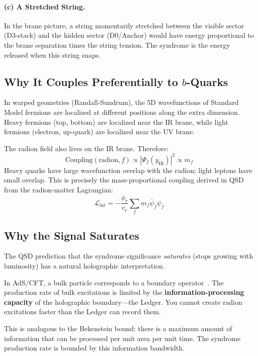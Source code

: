 \documentclass[11pt,a4paper]{article}
\theoremstyle{definition}
\newcommand{\LL}{\mathcal{L}}
\begin{document}
\paragraph{(c) A Stretched String.}
In the brane picture, a string momentarily stretched between the visible
sector (D3-stack) and the hidden sector (D0/Anchor) would have energy
proportional to the brane separation times the string tension.  The
syndrome is the energy released when this string snaps.

\subsection{Why It Couples Preferentially to $b$-Quarks}

In warped geometries (Randall-Sundrum), the 5D wavefunctions of Standard
Model fermions are localized at different positions along the extra
dimension.  Heavy fermions (top, bottom) are localized near the IR
brane, while light fermions (electron, up-quark) are localized near the
UV brane.

The radion field also lives on the IR brane.  Therefore:
\begin{equation}
\text{Coupling}(\text{radion}, f) \propto
    |\Psi_f(y_{\text{IR}})|^2 \propto m_f
\end{equation}
Heavy quarks have large wavefunction overlap with the radion; light leptons
have small overlap.  This is precisely the mass-proportional coupling
derived in QSD from the radion-matter Lagrangian:
\begin{equation}
\LL_{\text{int}} = -\frac{\phi_r}{v_r}\sum_f m_f\bar\psi_f\psi_f
\end{equation}

\subsection{Why the Signal Saturates}

The QSD prediction that the syndrome significance \emph{saturates} (stops
growing with luminosity) has a natural holographic interpretation.

In AdS/CFT, a bulk particle corresponds to a boundary operator~\cite{Maldacena1999,Almheiri2015}.  The production rate of bulk excitations is limited by the \textbf{information-processing capacity} of the holographic boundary---the Ledger.  You cannot create radion excitations faster than the Ledger can record them.

This is analogous to the Bekenstein bound: there is a maximum amount of
information that can be processed per unit area per unit time.  The
syndrome production rate is bounded by this information bandwidth.
\end{document}
